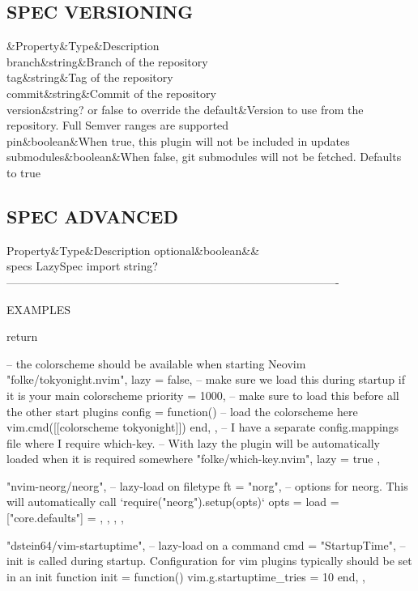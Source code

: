 \begin{listing}
\subsection{SPEC VERSIONING}
\begin{}
&Property&Type&Description\\\hline
branch&string&Branch of the repository\\\hline
tag&string&Tag of the repository\\\hline
commit&string&Commit of the repository\\\hline
version&string? or false to override the default&Version to use from the repository. Full Semver ranges are supported\\\hline
pin&boolean&When true, this plugin will not be included in updates\\\hline
submodules&boolean&When false, git submodules will not be fetched. Defaults to true
\end{}

\subsection{SPEC ADVANCED}
Property&Type&Description
optional&boolean&&\\\hline
  specs      LazySpec  
  import     string? 
  ----------------------------------------------------------------------------------------

EXAMPLES


return {
-- the colorscheme should be available when starting Neovim
{
"folke/tokyonight.nvim",
lazy = false, -- make sure we load this during startup if it is your main colorscheme
priority = 1000, -- make sure to load this before all the other start plugins
config = function()
-- load the colorscheme here
vim.cmd([[colorscheme tokyonight]])
end,
},
-- I have a separate config.mappings file where I require which-key.
-- With lazy the plugin will be automatically loaded when it is required somewhere
{ "folke/which-key.nvim", lazy = true },

{
"nvim-neorg/neorg",
-- lazy-load on filetype
ft = "norg",
-- options for neorg. This will automatically call `require("neorg").setup(opts)`
opts = {
load = {
["core.defaults"] = {},
},
},
},

{
"dstein64/vim-startuptime",
-- lazy-load on a command
cmd = "StartupTime",
-- init is called during startup. Configuration for vim plugins typically should be set in an init function
init = function()
vim.g.startuptime_tries = 10
end,
},

}
\end{listing}
